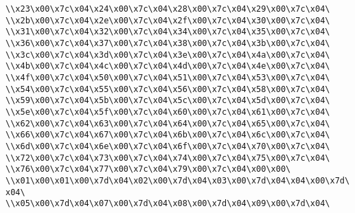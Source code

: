 \verb|\\x23\x00\x7c\x04\x24\x00\x7c\x04\x28\x00\x7c\x04\x29\x00\x7c\x04\|\newline
\verb|\\x2b\x00\x7c\x04\x2e\x00\x7c\x04\x2f\x00\x7c\x04\x30\x00\x7c\x04\|\newline
\verb|\\x31\x00\x7c\x04\x32\x00\x7c\x04\x34\x00\x7c\x04\x35\x00\x7c\x04\|\newline
\verb|\\x36\x00\x7c\x04\x37\x00\x7c\x04\x38\x00\x7c\x04\x3b\x00\x7c\x04\|\newline
\verb|\\x3c\x00\x7c\x04\x3d\x00\x7c\x04\x3e\x00\x7c\x04\x4a\x00\x7c\x04\|\newline
\verb|\\x4b\x00\x7c\x04\x4c\x00\x7c\x04\x4d\x00\x7c\x04\x4e\x00\x7c\x04\|\newline
\verb|\\x4f\x00\x7c\x04\x50\x00\x7c\x04\x51\x00\x7c\x04\x53\x00\x7c\x04\|\newline
\verb|\\x54\x00\x7c\x04\x55\x00\x7c\x04\x56\x00\x7c\x04\x58\x00\x7c\x04\|\newline
\verb|\\x59\x00\x7c\x04\x5b\x00\x7c\x04\x5c\x00\x7c\x04\x5d\x00\x7c\x04\|\newline
\verb|\\x5e\x00\x7c\x04\x5f\x00\x7c\x04\x60\x00\x7c\x04\x61\x00\x7c\x04\|\newline
\verb|\\x62\x00\x7c\x04\x63\x00\x7c\x04\x64\x00\x7c\x04\x65\x00\x7c\x04\|\newline
\verb|\\x66\x00\x7c\x04\x67\x00\x7c\x04\x6b\x00\x7c\x04\x6c\x00\x7c\x04\|\newline
\verb|\\x6d\x00\x7c\x04\x6e\x00\x7c\x04\x6f\x00\x7c\x04\x70\x00\x7c\x04\|\newline
\verb|\\x72\x00\x7c\x04\x73\x00\x7c\x04\x74\x00\x7c\x04\x75\x00\x7c\x04\|\newline
\verb|\\x76\x00\x7c\x04\x77\x00\x7c\x04\x79\x00\x7c\x04\x00\x00\|\newline
\verb|\\x01\x00\x01\x00\x7d\x04\x02\x00\x7d\x04\x03\x00\x7d\x04\x04\x00\x7d\x04\|\newline
\verb|\\x05\x00\x7d\x04\x07\x00\x7d\x04\x08\x00\x7d\x04\x09\x00\x7d\x04\|\newline
